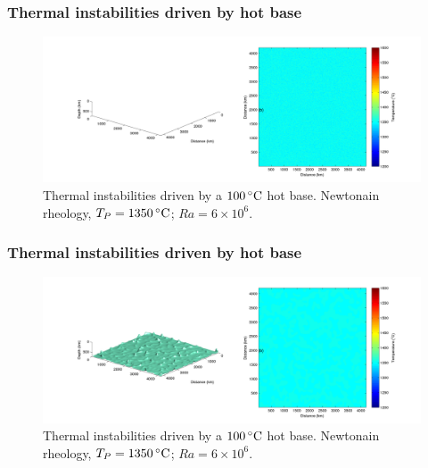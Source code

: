 \documentclass[aspectratio=169]{beamer}
\begin{document}
\begin{frame}
    \frametitle{Thermal instabilities driven by hot base}
    \begin{figure}
        \vspace{-.5cm}
        \includegraphics[width=0.85\paperwidth]{./figures/Newt100/dT1.0741_4x4_Newt_Ra6e6_0.png}
        \caption{Thermal instabilities driven by a $100\rm\,^{\circ}C$ hot base. Newtonain rheology, $T_{P}=1350\rm\,^{\circ}C$; $Ra = 6\times10^{6}$.}
    \end{figure}
\end{frame}

\begin{frame}
    \frametitle{Thermal instabilities driven by hot base}
    \begin{figure}
        \vspace{-.5cm}
        \includegraphics[width=0.85\paperwidth]{./figures/Newt100/dT1.0741_4x4_Newt_Ra6e6_1.png}
        \caption{Thermal instabilities driven by a $100\rm\,^{\circ}C$ hot base. Newtonain rheology, $T_{P}=1350\rm\,^{\circ}C$; $Ra = 6\times10^{6}$.}
    \end{figure}
\end{frame}
\end{document}
